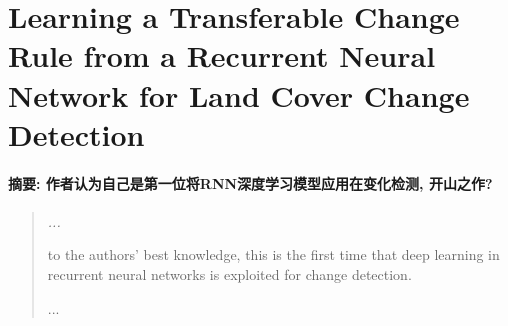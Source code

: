 \section{Learning a Transferable Change Rule from a Recurrent Neural Network for Land Cover Change Detection}

\paragraph*{摘要:
    \textcolor[RGB]{17, 205, 29}{作者认为自己是第一位将RNN深度学习模型应用在变化检测, 开山之作?}}
\begin{quotation}
    \itshape
    ...

    to the authors’ best knowledge, this is the first time
that deep learning in recurrent neural networks is exploited for change detection.

    ...
\end{quotation}

